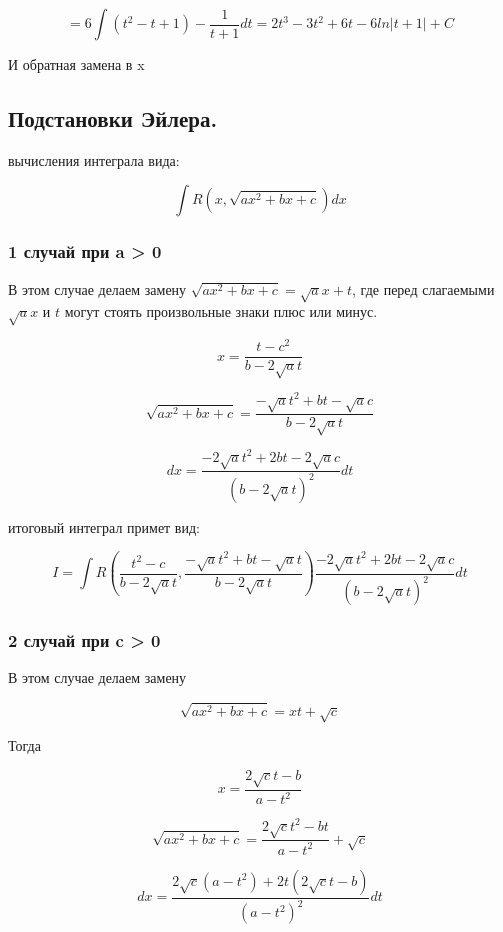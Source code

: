\documentclass[a4paper,12pt]{article}
\theoremstyle{plain} %
\theoremstyle{definition} %
\theoremstyle{remark} %
\begin{document}
\[
	= 6 \int (t^2 - t + 1) - \frac{1}{t + 1}dt = 2 t^3 - 3t^2 + 6t - 6 ln|t + 1| + C
\]

И обратная замена в x




\newpage
\subsection*{Подстановки Эйлера.                                                                          }

вычисления интеграла вида:

\[
	\int R(x, \sqrt{ax^2 + bx + c}) dx
\]

\subsubsection*{1 случай при a > 0}

В этом случае делаем замену $\sqrt{ax^2 + bx + c} = \sqrt{a}x + t$, где перед слагаемыми $\sqrt{a}x$ и $t$ могут стоять произвольные знаки плюс или минус.

\[ x = \frac{t - c^2}{b - 2 \sqrt{a}t} \]

\[
	\sqrt{ax^2 + bx + c} = \frac{- \sqrt{a}t^2 + bt - \sqrt{a}c}{b - 2\sqrt{a}t}
\]

\[
	dx =  \frac{-2 \sqrt{a}t^2 + 2bt - 2\sqrt{a}c}{(b - 2\sqrt{a}t)^2} dt
\]

итоговый интеграл примет вид:

\[
	I = \int R \left(\frac{t^2 - c}{b - 2\sqrt{a}t}, \frac{-\sqrt{a}t^2 + bt - \sqrt{a}t}{b - 2\sqrt{a}t} \right) \frac{-2\sqrt{a}t^2 + 2bt - 2\sqrt{a}c}{(b - 2 \sqrt{a}t)^2}dt
\]

\subsubsection*{2 случай при c > 0}

В этом случае делаем замену

\[
	\sqrt{ax^2 + bx + c} = xt + \sqrt{c}
\]

Тогда

\[
	x = \frac{2\sqrt{c} t - b}{a - t^2}
\]

\[
	\sqrt{ax^2 + bx + c} = \frac{2\sqrt{c} t^2 - bt}{a - t^2} + \sqrt{c}
\]

\[
	dx = \frac{2\sqrt{c}(a - t^2) + 2t(2\sqrt{c}t - b)}{(a - t^2)^2} dt
\]
\end{document}
